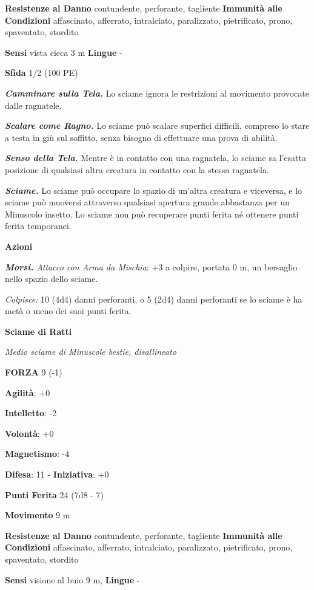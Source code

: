 \begin{multicols}{2}
\textbf{Resistenze al Danno} contundente, perforante, tagliente
\textbf{Immunità alle Condizioni} affascinato, afferrato, intralciato,
paralizzato, pietrificato, prono, spaventato, stordito

\textbf{Sensi} vista cieca 3 m \textbf{Lingue} -

\textbf{Sfida} 1/2 (100 PE)

\emph{\textbf{Camminare sulla Tela.}} Lo sciame ignora le restrizioni al
movimento provocate dalle ragnatele.

\emph{\textbf{Scalare come Ragno.}} Lo sciame può scalare superfici
difficili, compreso lo stare a testa in giù sul soffitto, senza bisogno
di effettuare una prova di abilità.

\emph{\textbf{Senso della Tela.}} Mentre è in contatto con una
ragnatela, lo sciame sa l'esatta posizione di qualsiasi altra creatura
in contatto con la stessa ragnatela.

\emph{\textbf{Sciame.}} Lo sciame può occupare lo spazio di un'altra
creatura e viceversa, e lo sciame può muoversi attraverso qualsiasi
apertura grande abbastanza per un Minuscolo insetto. Lo sciame non può
recuperare punti ferita né ottenere punti ferita temporanei.

\textbf{Azioni}

\emph{\textbf{Morsi.} Attacco con Arma da Mischia}: +3 a colpire,
portata 0 m, un bersaglio nello spazio dello sciame.

\emph{Colpisce:} 10 (4d4) danni perforanti, o 5 (2d4) danni perforanti
se lo sciame è ha metà o meno dei suoi punti ferita.

\textbf{Sciame di Ratti}

\emph{Medio sciame di Minuscole bestie, disallineato}

\textbf{FORZA} 9 (-1)

\textbf{Agilità}: +0

\textbf{Intelletto}: -2

\textbf{Volontà}: +0

\textbf{Magnetismo}: -4

\textbf{Difesa}: 11 - \textbf{Iniziativa}: +0

\textbf{Punti Ferita} 24 (7d8 - 7)

\textbf{Movimento} 9 m

\textbf{Resistenze al Danno} contundente, perforante, tagliente
\textbf{Immunità alle Condizioni} affascinato, afferrato, intralciato,
paralizzato, pietrificato, prono, spaventato, stordito

\textbf{Sensi} visione al buio 9 m, 
\textbf{Lingue} -


\end{multicols}
